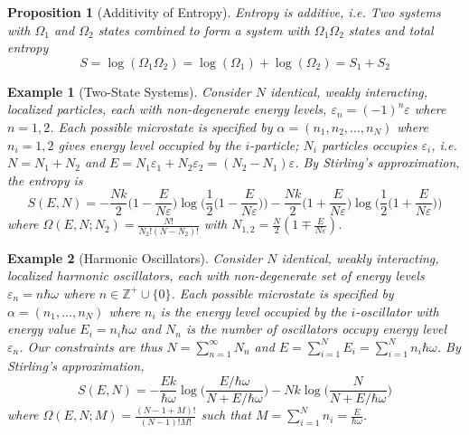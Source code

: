 \documentclass[a4paper]{article}
\newtheorem{eg}{Example}[section]
\theoremstyle{new}
\newtheorem{prop}{Proposition}[section]
\begin{document}
\begin{prop}[Additivity of Entropy]
Entropy is additive, i.e.
Two systems with $\Omega_1$ and $\Omega_2$ states combined to form a system with $\Omega_1\Omega_2$ states and total entropy $$S=\log(\Omega_1\Omega_2)=\log(\Omega_1)+\log(\Omega_2)=S_1+S_2$$
\end{prop}
\begin{eg}[Two-State Systems]
Consider $N$ identical, weakly interacting, localized particles, each with non-degenerate energy levels, $\varepsilon_n=(-1)^n\varepsilon$ where $n=1,2$. Each possible microstate is specified by $\alpha=(n_1,n_2,...,n_N)$ where $n_i=1,2$ gives energy level occupied by the $i$-particle; $N_i$ particles occupies $\varepsilon_i$, i.e. $N=N_1+N_2$ and $E=N_1\varepsilon_1+N_2\varepsilon_2=(N_2-N_1)\varepsilon$. By Stirling's approximation, the entropy is
$$S(E,N)=-\frac{Nk}{2}\bigg(1-\frac{E}{N\varepsilon}\bigg)\log\bigg(\frac{1}{2}\bigg(1-\frac{E}{N\varepsilon}\bigg)\bigg)-\frac{Nk}{2}\bigg(1+\frac{E}{N\varepsilon}\bigg)\log\bigg(\frac{1}{2}\bigg(1+\frac{E}{N\varepsilon}\bigg)\bigg)$$
where $\Omega(E,N;N_2)=\frac{N!}{N_2!(N-N_2)!}$ with $N_{1,2}=\frac{N}{2}(1\mp\frac{E}{N\varepsilon})$. 
\end{eg}
\begin{eg}[Harmonic Oscillators]
Consider $N$ identical, weakly interacting, localized harmonic oscillators, each with non-degenerate set of energy levels $\varepsilon_n=n\hbar\omega$ where $n\in\mathbb{Z}^+\cup\{0\}$. Each possible microstate is specified by $\alpha=(n_1,...,n_N)$ where $n_i$ is the energy level occupied by the $i$-oscillator with energy value $E_i=n_i\hbar\omega$ and $N_n$ is the number of oscillators occupy energy level $\varepsilon_n$. Our constraints are thus $N=\sum_{n=1}^\infty N_n$ and $E=\sum_{i=1}^NE_i=\sum_{i=1}^Nn_i\hbar\omega$. By Stirling's approximation,
$$S(E,N)=-\frac{Ek}{\hbar\omega}\log\bigg(\frac{E/\hbar\omega}{N+E/\hbar\omega}\bigg)-Nk\log\bigg(\frac{N}{N+E/\hbar\omega}\bigg)$$
where $\Omega(E,N;M)=\frac{(N-1+M)!}{(N-1)!M!}$ such that $M=\sum_{i=1}^Nn_i=\frac{E}{\hbar\omega}$.
\end{eg}
\newpage
\end{document}
